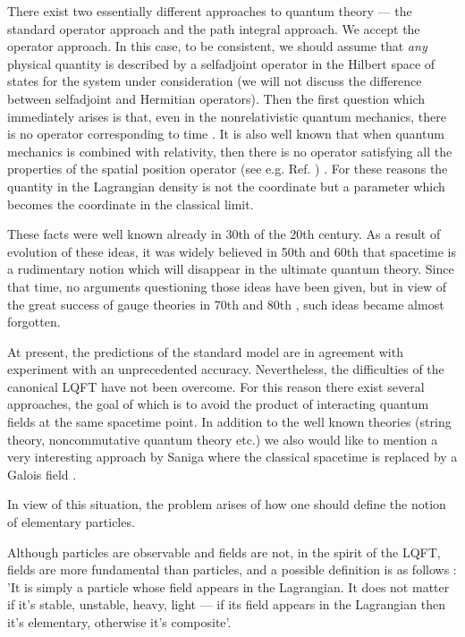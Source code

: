 \documentclass[a4paper,12pt]{article}%
\begin{document}
There exist two essentially different approaches to quantum 
theory --- the standard operator approach and the path 
integral approach. We accept the operator approach. In this 
case, to be consistent, we should assume that {\it any} 
physical quantity is described by a selfadjoint operator 
in the Hilbert space of states for the system under 
consideration (we will not discuss the difference between 
selfadjoint and Hermitian operators).
Then the first question which immediately arises is that, 
even in the nonrelativistic quantum mechanics, there is no 
operator corresponding to time \cite{time}. It is also 
well known that when quantum mechanics is combined with 
relativity, then there is no operator satisfying all the 
properties of the spatial position operator 
(see e.g. Ref. \cite{Schweber}) . For these reasons the 
quantity \coordHE{} in the Lagrangian density \coordHE{} is not 
the coordinate but a parameter which becomes the 
coordinate in the classical limit.

These facts were well known already in 30th of the 20th 
century. As a result of evolution of these ideas, it 
was widely believed in 50th and 60th that spacetime is 
a rudimentary notion which will disappear in the 
ultimate quantum theory. Since that time, no arguments 
questioning those ideas have been given, but in view of 
the great success of gauge theories in 70th and 80th , 
such ideas became almost forgotten. 

At present, the predictions of the standard model are 
in agreement with experiment with an unprecedented 
accuracy. Nevertheless, the difficulties of the 
canonical LQFT have not been overcome. For this reason 
there exist several approaches, the goal of which is 
to avoid the product of interacting quantum fields at 
the same spacetime point. In addition to the well 
known theories (string theory, noncommutative quantum 
theory etc.) we also would like to mention a very 
interesting approach by Saniga where the classical 
spacetime is replaced by a Galois field \cite{Saniga}.

In view of this situation, the problem arises of how 
one should define the notion of elementary particles. 

Although particles are observable and fields are not, 
in the spirit of the LQFT, fields are more fundamental 
than particles, and a possible definition is as 
follows \cite{Wein1}: 'It is simply a particle whose
field appears in the Lagrangian. It does not matter if
it's stable, unstable, heavy, light --- if its field 
appears in the Lagrangian then it's elementary, 
otherwise it's composite'.
    
\end{document}
